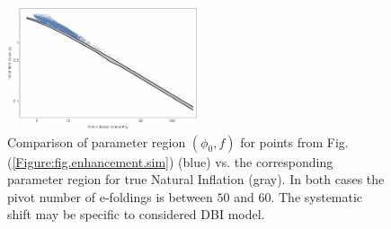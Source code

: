 \documentclass[12pt]{article}
\begin{document}
\begin{figure}
  \centering
  \includegraphics[width=0.5\textwidth]{figs/figc.pdf}
  \caption{Comparison of parameter region $\left({\phi}_{0}, f\right)$ for points from Fig.(\ref{Figure:fig.enhancement.sim}) (blue) vs. the corresponding parameter region for true Natural Inflation (gray). In both cases the pivot number of e-foldings is between $50$ and $60$. The systematic shift may be specific to considered DBI model.}
  \label{fig.comparison.sim}
\end{figure}
\end{document}
